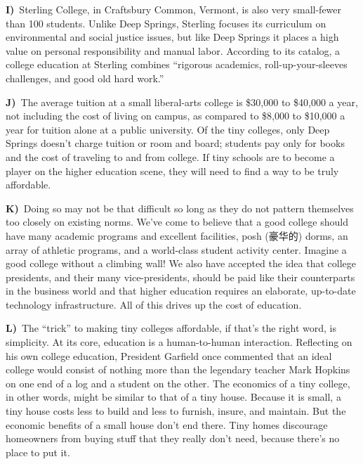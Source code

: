 \smallskip
\noindent\textbf{I)}\ Sterling College, in Craftsbury Common, Vermont, is also very small-fewer than 100 students. Unlike Deep Springs, Sterling focuses its curriculum on environmental and social justice issues, but like Deep Springs it places a high value on personal responsibility and manual labor. According to its catalog, a college education at Sterling combines ``rigorous academics, roll-up-your-sleeves challenges, and good old hard work.''\par
\smallskip
\noindent\textbf{J)}\ The average tuition at a small liberal-arts college is \$30,000 to \$40,000 a year, not including the cost of living on campus, as compared to \$8,000 to \$10,000 a year for tuition alone at a public university. Of the tiny colleges, only Deep Springs doesn't charge tuition or room and board; students pay only for books and the cost of traveling to and from college. If tiny schools are to become a player on the higher education scene, they will need to find a way to be truly affordable.\par
\smallskip
\noindent\textbf{K)}\ Doing so may not be that difficult so long as they do not pattern themselves too closely on existing norms. We've come to believe that a good college should have many academic programs and excellent facilities, posh (豪华的) dorms, an array of athletic programs, and a world-class student activity center. Imagine a good college without a climbing wall! We also have accepted the idea that college presidents, and their many vice-presidents, should be paid like their counterparts in the business world and that higher education requires an elaborate, up-to-date technology infrastructure. All of this drives up the cost of education.\par
\smallskip
\noindent\textbf{L)}\ The ``trick'' to making tiny colleges affordable, if that's the right word, is simplicity. At its core, education is a human-to-human interaction. Reflecting on his own college education, President Garfield once commented that an ideal college would consist of nothing more than the legendary teacher Mark Hopkins on one end of a log and a student on the other. The economics of a tiny college, in other words, might be similar to that of a tiny house. Because it is small, a tiny house costs less to build and less to furnish, insure, and maintain. But the economic benefits of a small house don't end there. Tiny homes discourage homeowners from buying stuff that they really don't need, because there's no place to put it.\par
\smallskip
